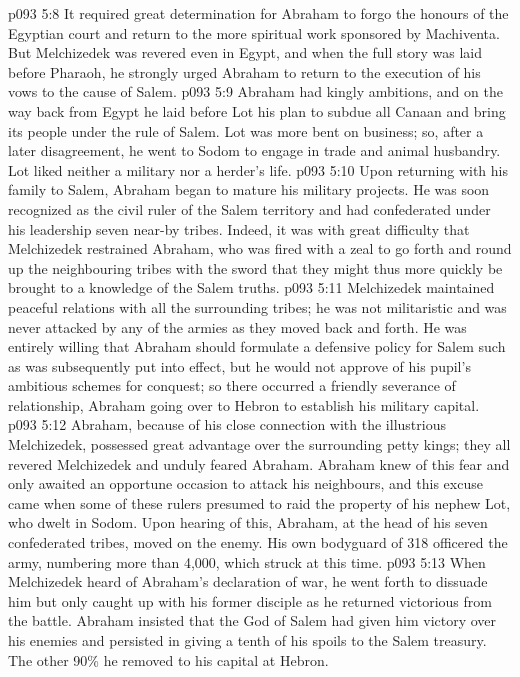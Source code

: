 \vs p093 5:8 It required great determination for Abraham to forgo the honours of the Egyptian court and return to the more spiritual work sponsored by Machiventa. But Melchizedek was revered even in Egypt, and when the full story was laid before Pharaoh, he strongly urged Abraham to return to the execution of his vows to the cause of Salem.
\vs p093 5:9 \pc Abraham had kingly ambitions, and on the way back from Egypt he laid before Lot his plan to subdue all Canaan and bring its people under the rule of Salem. Lot was more bent on business; so, after a later disagreement, he went to Sodom to engage in trade and animal husbandry. Lot liked neither a military nor a herder’s life.
\vs p093 5:10 Upon returning with his family to Salem, Abraham began to mature his military projects. He was soon recognized as the civil ruler of the Salem territory and had confederated under his leadership seven near-by tribes. Indeed, it was with great difficulty that Melchizedek restrained Abraham, who was fired with a zeal to go forth and round up the neighbouring tribes with the sword that they might thus more quickly be brought to a knowledge of the Salem truths.
\vs p093 5:11 Melchizedek maintained peaceful relations with all the surrounding tribes; he was not militaristic and was never attacked by any of the armies as they moved back and forth. He was entirely willing that Abraham should formulate a defensive policy for Salem such as was subsequently put into effect, but he would not approve of his pupil’s ambitious schemes for conquest; so there occurred a friendly severance of relationship, Abraham going over to Hebron to establish his military capital.
\vs p093 5:12 Abraham, because of his close connection with the illustrious Melchizedek, possessed great advantage over the surrounding petty kings; they all revered Melchizedek and unduly feared Abraham. Abraham knew of this fear and only awaited an opportune occasion to attack his neighbours, and this excuse came when some of these rulers presumed to raid the property of his nephew Lot, who dwelt in Sodom. Upon hearing of this, Abraham, at the head of his seven confederated tribes, moved on the enemy. His own bodyguard of 318 officered the army, numbering more than 4,000, which struck at this time.
\vs p093 5:13 When Melchizedek heard of Abraham’s declaration of war, he went forth to dissuade him but only caught up with his former disciple as he returned victorious from the battle. Abraham insisted that the God of Salem had given him victory over his enemies and persisted in giving a tenth of his spoils to the Salem treasury. The other 90\% he removed to his capital at Hebron.

